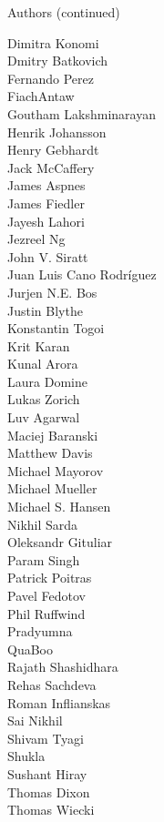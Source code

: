 \begin{frame}{Authors (continued)}
\begin{multicols}{5}
\tiny
Dimitra Konomi\\
Dmitry Batkovich\\
Fernando Perez\\
FiachAntaw\\
Goutham Lakshminarayan\\
Henrik Johansson\\
Henry Gebhardt\\
Jack McCaffery\\
James Aspnes\\
James Fiedler\\
Jayesh Lahori\\
Jezreel Ng\\
John V. Siratt\\
Juan Luis Cano Rodríguez\\
Jurjen N.E. Bos\\
Justin Blythe\\
Konstantin Togoi\\
Krit Karan\\
Kunal Arora\\
Laura Domine\\
Lukas Zorich\\
Luv Agarwal\\
Maciej Baranski\\
Matthew Davis\\
Michael Mayorov\\
Michael Mueller\\
Michael S. Hansen\\
Nikhil Sarda\\
Oleksandr Gituliar\\
Param Singh\\
Patrick Poitras\\
Pavel Fedotov\\
Phil Ruffwind\\
Pradyumna\\
QuaBoo\\
Rajath Shashidhara\\
Rehas Sachdeva\\
Roman Inflianskas\\
Sai Nikhil\\
Shivam Tyagi\\
Shukla\\
Sushant Hiray\\
Thomas Dixon\\
Thomas Wiecki\\

\end{multicols}
\end{frame}
